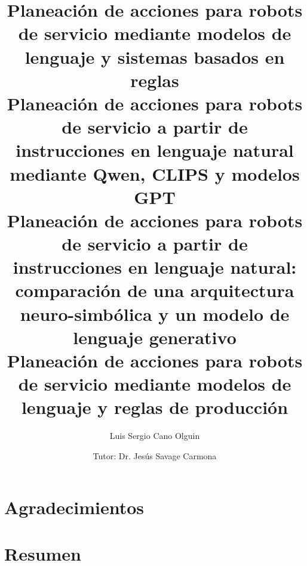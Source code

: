 \documentclass[letterpaper,12pt,openany]{book}
\begin{document}
%
\title{Planeación de acciones para robots de servicio mediante modelos de lenguaje y sistemas basados en reglas \\ Planeación de acciones para robots de servicio a partir de instrucciones en lenguaje natural mediante Qwen, CLIPS y modelos GPT \\  Planeación de acciones para robots de servicio a partir de instrucciones en lenguaje natural: comparación de una arquitectura neuro-simbólica y un modelo de lenguaje generativo \\ Planeación de acciones para robots de servicio mediante modelos de lenguaje y reglas de producción}
\author{Luis Sergio Cano Olguin}
\date{Tutor: Dr. Jesús Savage Carmona}


\frontmatter
\renewcommand{\tablename}{Tabla}
 \maketitle
\chapter*{Agradecimientos}

\chapter*{Resumen}

\tableofcontents
\listoffigures

\mainmatter









%

\appendix




\end{document}
